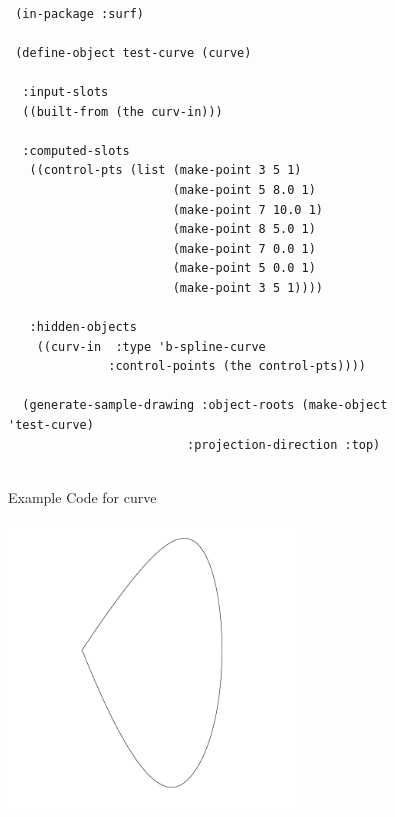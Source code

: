 \documentclass [11pt]{book}
\begin{document}
\begin{itemize}
\begin{description}
\end{description}




\begin{figure}
\begin{lrbox}{\boxedverb}
\begin{minipage}{\linewidth}
{\small

\begin{verbatim}
 
 (in-package :surf)

 (define-object test-curve (curve)
  
  :input-slots
  ((built-from (the curv-in)))
  
  :computed-slots
   ((control-pts (list (make-point 3 5 1)
                       (make-point 5 8.0 1) 
                       (make-point 7 10.0 1) 
                       (make-point 8 5.0 1) 
                       (make-point 7 0.0 1) 
                       (make-point 5 0.0 1) 
                       (make-point 3 5 1))))
   
   :hidden-objects
    ((curv-in  :type 'b-spline-curve
              :control-points (the control-pts))))

  (generate-sample-drawing :object-roots (make-object 'test-curve)
                         :projection-direction :top)
  
\end{verbatim}}
\end{minipage}
\end{lrbox}
\fbox{\usebox{\boxedverb}}

\caption{Example Code for curve}

\label{fig:example-code-curve}

\end{figure}

\begin{figure}
\begin{center}
\includegraphics[width=3in,height=3in]{../images/example-curve.pdf}
\end{center}


\end{figure}
\end{itemize}
\end{document}
